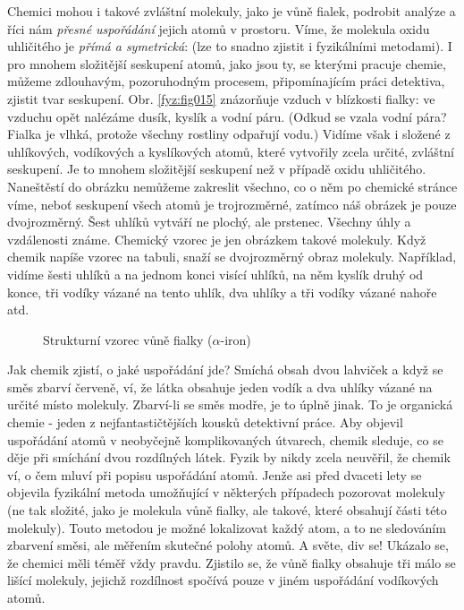     Chemici mohou i takové zvláštní molekuly, jako je vůně fialek, podrobit analýze a říci nám
    \emph{přesné uspořádání} jejich atomů v prostoru. Víme, že molekula oxidu uhličitého je
    \emph{přímá a symetrická}:  (lze to snadno zjistit i fyzikálními
    metodami). I pro mnohem složitější seskupení atomů, jako jsou ty, se kterými pracuje chemie,
    můžeme zdlouhavým, pozoruhodným procesem, připomínajícím práci detektiva, zjistit tvar
    seskupení. Obr. \ref{fyz:fig015} znázorňuje vzduch v blízkosti fialky: ve vzduchu opět nalézáme
    dusík, kyslík a vodní páru. (Odkud se vzala vodní pára? Fialka je vlhká, protože všechny
    rostliny odpařují vodu.) Vidíme však i  složené z uhlíkových, vodíkových a
    kyslíkových atomů, které vytvořily zcela určité, zvláštní seskupení. Je to mnohem složitější
    seskupení než v případě oxidu uhličitého. Naneštěstí do obrázku nemůžeme zakreslit všechno, co o
    něm po chemické stránce víme, neboť seskupení všech atomů je trojrozměrné, zatímco náš obrázek
    je pouze dvojrozměrný. Šest uhlíků vytváří ne plochý, ale  prstenec. Všechny úhly
    a vzdálenosti známe. Chemický vzorec je jen obrázkem takové molekuly. Když chemik napíše vzorec
    na tabuli, snaží se  dvojrozměrný obraz molekuly. Například, vidíme 
    šesti uhlíků a na jednom konci visící  uhlíků, na něm kyslík druhý od konce, tři
    vodíky vázané na tento uhlík, dva uhlíky a tři vodíky vázané nahoře atd.

    \begin{figure}[hbt!]    %
      \centering
      \caption{Strukturní vzorec vůně fialky (\(\alpha\)-iron) \cite[s.~24]{Feynman01}}
      \label{fyz:fig016}
    \end{figure}

    Jak chemik zjistí, o jaké uspořádání jde? Smíchá obsah dvou lahviček a když se směs zbarví
    červeně, ví, že látka obsahuje jeden vodík a dva uhlíky vázané na určité místo molekuly.
    Zbarví-li se směs modře, je to úplně jinak. To je organická chemie - jeden z nejfantastičtějších
    kousků detektivní práce. Aby objevil uspořádání atomů v neobyčejně komplikovaných útvarech,
    chemik sleduje, co se děje při smíchání dvou rozdílných látek. Fyzik by nikdy zcela neuvěřil, že
    chemik ví, o čem mluví při popisu uspořádání atomů. Jenže asi před dvaceti lety se objevila
    fyzikální metoda umožňující v některých případech pozorovat molekuly (ne tak složité, jako je
    molekula vůně fialky, ale takové, které obsahují části této molekuly). Touto metodou je možné
    lokalizovat každý atom, a to ne sledováním zbarvení směsi, ale měřením skutečné polohy atomů. A
    světe, div se! Ukázalo se, že chemici měli téměř vždy pravdu. Zjistilo se, že vůně fialky
    obsahuje tři málo se lišící molekuly, jejichž rozdílnost spočívá pouze v jiném uspořádání
    vodíkových atomů. 
    
